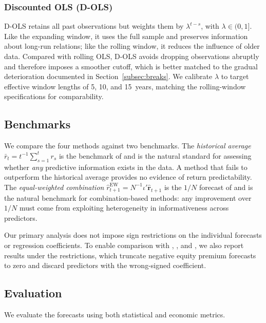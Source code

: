 \documentclass[a4paper,11pt]{article}
\begin{document}
\subsubsection{Discounted OLS (D-OLS)}\label{subsubsec:dols}

D-OLS retains all past observations but weights them by
$\lambda^{t-s}$, with $\lambda \in (0, 1]$. Like the expanding window, it
uses the full sample and preserves information about long-run relations;
like the rolling window, it reduces the influence of older data.
Compared with rolling OLS, D-OLS avoids dropping observations abruptly
and therefore imposes a smoother cutoff, which is better matched to the
gradual deterioration documented in Section~\ref{subsec:breaks}. We
calibrate $\lambda$ to target effective window lengths of 5, 10, and
15~years, matching the rolling-window specifications for comparability.

\subsection{Benchmarks}\label{subsec:benchmarks}

We compare the four methods against two benchmarks. The
\emph{historical average} $\bar{r}_t = t^{-1}\sum_{s=1}^{t} r_s$ is the
benchmark of \citet{goyalwelch2008} and is the natural standard for
assessing whether \emph{any} predictive information exists in the data.
A method that fails to outperform the historical average provides no
evidence of return predictability. The \emph{equal-weighted combination}
$\hat{r}^{\mathrm{EW}}_{t+1} = N^{-1}\iota'\hat{\mathbf{r}}_{t+1}$ is the
$1/N$ forecast of \citet{rsz2010} and is the natural benchmark for
combination-based methods: any improvement over $1/N$ must come from
exploiting heterogeneity in informativeness across predictors.

Our primary analysis does not impose sign restrictions on the individual
forecasts or regression coefficients. To enable comparison with
\citet{campbellthompson2008}, \citet{rsz2010}, and
\citet{denkloffler2024}, we also report results under the
\citet{campbellthompson2008} restrictions, which truncate negative equity
premium forecasts to zero and discard predictors with the wrong-signed
coefficient.

\subsection{Evaluation}\label{subsec:evaluation}

We evaluate the forecasts using both statistical and economic metrics.
\end{document}
